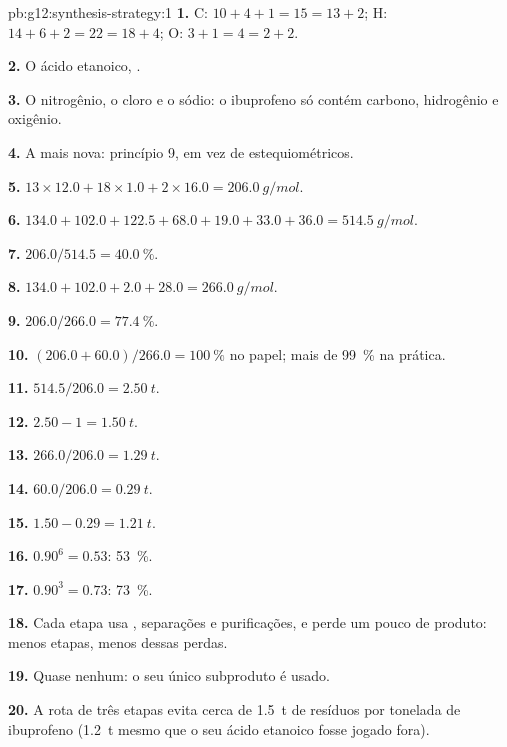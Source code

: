 \begin{solution}{pb:g12:synthesis-strategy:1}
\textbf{1.} C: $10 + 4 + 1 = 15 = 13 + 2$; H: $14 + 6 + 2 = 22 = 18 + 4$;
O: $3 + 1 = 4 = 2 + 2$.

\textbf{2.} O ácido etanoico, .

\textbf{3.} O nitrogênio, o cloro e o sódio: o ibuprofeno só contém
carbono, hidrogênio e oxigênio.

\textbf{4.} A mais nova: princípio 9,  em vez de 
estequiométricos.

\textbf{5.} $13 \times 12.0 + 18 \times 1.0 + 2 \times 16.0 =
\qty{206.0}{g/mol}$.

\textbf{6.} $134.0 + 102.0 + 122.5 + 68.0 + 19.0 + 33.0 + 36.0 =
\qty{514.5}{g/mol}$.

\textbf{7.} $206.0/514.5 = \qty{40.0}{\percent}$.

\textbf{8.} $134.0 + 102.0 + 2.0 + 28.0 = \qty{266.0}{g/mol}$.

\textbf{9.} $206.0/266.0 = \qty{77.4}{\percent}$.

\textbf{10.} $(206.0 + 60.0)/266.0 = \qty{100}{\percent}$ no papel; mais
de \qty{99}{\percent} na prática.

\textbf{11.} $514.5/206.0 = \qty{2.50}{t}$.

\textbf{12.} $2.50 - 1 = \qty{1.50}{t}$.

\textbf{13.} $266.0/206.0 = \qty{1.29}{t}$.

\textbf{14.} $60.0/206.0 = \qty{0.29}{t}$.

\textbf{15.} $1.50 - 0.29 = \qty{1.21}{t}$.

\textbf{16.} $0.90^6 = 0.53$: \qty{53}{\percent}.

\textbf{17.} $0.90^3 = 0.73$: \qty{73}{\percent}.

\textbf{18.} Cada etapa usa , separações e purificações, e perde
um pouco de produto: menos etapas, menos dessas perdas.

\textbf{19.} Quase nenhum: o seu único subproduto é usado.

\textbf{20.} A rota de três etapas evita cerca de \qty{1.5}{t} de
resíduos por tonelada de ibuprofeno (\qty{1.2}{t} mesmo que o seu ácido
etanoico fosse jogado fora).
\end{solution}

